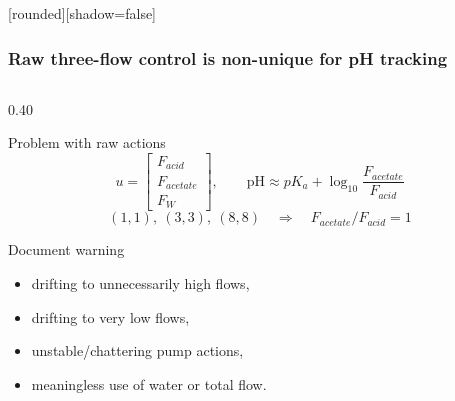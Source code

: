 \documentclass[aspectratio=169]{beamer}
\newcommand{\pH}{\mathrm{pH}}
\begin{document}
\begin{frame}
[rounded][shadow=false]
\frametitle{\large \textbf{Raw three-flow control is non-unique for pH tracking}}
\scriptsize

\vspace{-0.12cm}
\begin{columns}[T,onlytextwidth]
\begin{column}{0.40\textwidth}
\begin{block}{Problem with raw actions}
\vspace{-0.12cm}
\[
  u=\begin{bmatrix}F_{acid}\\F_{acetate}\\F_W\end{bmatrix},
  \qquad
  \pH\approx pK_a+\log_{10}\frac{F_{acetate}}{F_{acid}}
\]
\vspace{-0.20cm}
\[
  (1,1),\ (3,3),\ (8,8)
  \quad\Rightarrow\quad
  F_{acetate}/F_{acid}=1
\]
\vspace{-0.15cm}
\end{block}

\vspace{0.04cm}
\begin{block}{Document warning}
\begin{itemize}\raggedright
  \setlength\itemsep{0.35ex}
  \item drifting to unnecessarily high flows,
  \item drifting to very low flows,
  \item unstable/chattering pump actions,
  \item meaningless use of water or total flow.
\end{itemize}
\end{block}
\end{column}


\end{columns}
\end{frame}
\end{document}
